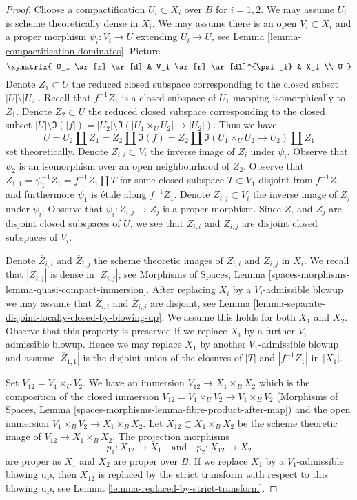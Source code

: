\begin{proof}
Choose a compactification $U_i \subset X_i$ over $B$ for $i = 1, 2$. We may
assume $U_i$ is scheme theoretically dense in $X_i$. We may assume there
is an open $V_i \subset X_i$ and a proper morphism
$\psi_i : V_i \to U$ extending $U_i \to U$, see
Lemma \ref{lemma-compactification-dominates}. Picture
$$
\xymatrix{
U_i \ar[r] \ar[d] & V_i \ar[r] \ar[dl]^{\psi_i} & X_i \\
U
}
$$
Denote $Z_1 \subset U$ the reduced closed subspace corresponding
to the closed subset $|U| \setminus |U_2|$. Recall that $f^{-1}Z_1$
is a closed subspace of $U_1$ mapping isomorphically to $Z_1$.
Denote $Z_2 \subset U$ the reduced closed subspace corresponding
to the closed subset $|U| \setminus \Im(|f|) =
|U_2| \setminus \Im(|U_1 \times_U U_2| \to |U_2|)$.
Thus we have
$$
U = U_2 \amalg Z_1 = Z_2 \amalg \Im(f) =
Z_2 \amalg \Im(U_1 \times_U U_2 \to U_2) \amalg Z_1
$$
set theoretically. Denote $Z_{i, i} \subset V_i$ the inverse image of $Z_i$
under $\psi_i$. Observe that $\psi_2$ is an isomorphism over an open
neighbourhood of $Z_2$. Observe that
$Z_{1, 1} = \psi_1^{-1}Z_1 = f^{-1}Z_1 \amalg T$ for some
closed subspace $T \subset V_1$ disjoint from $f^{-1}Z_1$ and furthermore
$\psi_1$ is \'etale along $f^{-1}Z_1$.
Denote $Z_{i, j} \subset V_i$ the inverse image of $Z_j$ under $\psi_i$.
Observe that $\psi_i : Z_{i, j} \to Z_j$ is a proper morphism.
Since $Z_i$ and $Z_j$ are disjoint closed subspaces of $U$, we see that
$Z_{i, i}$ and $Z_{i, j}$ are disjoint closed subspaces of $V_i$.

\medskip\noindent
Denote $\overline{Z}_{i, i}$ and $\overline{Z}_{i, j}$ the
scheme theoretic images of $Z_{i, i}$ and $Z_{i, j}$ in $X_i$.
We recall that $|Z_{i, j}|$ is dense in $|\overline{Z}_{i, j}|$, see
Morphisms of Spaces, Lemma
\ref{spaces-morphisms-lemma-quasi-compact-immersion}.
After replacing $X_i$ by a $V_i$-admissible blowup we may assume that
$\overline{Z}_{i, i}$ and $\overline{Z}_{i, j}$ are disjoint, see
Lemma \ref{lemma-separate-disjoint-locally-closed-by-blowing-up}.
We assume this holds for both $X_1$ and $X_2$.
Observe that this property is preserved if we replace $X_i$
by a further $V_i$-admissible blowup. Hence we may replace $X_1$ by another
$V_1$-admissible blowup and assume $|\overline{Z}_{1, 1}|$
is the disjoint union of the closures of $|T|$ and $|f^{-1}Z_1|$ in $|X_1|$.

\medskip\noindent
Set $V_{12} = V_1 \times_U V_2$. We have an immersion
$V_{12} \to X_1 \times_B X_2$ which is the composition of the closed
immersion $V_{12} = V_1 \times_U V_2 \to V_1 \times_B V_2$
(Morphisms of Spaces, Lemma
\ref{spaces-morphisms-lemma-fibre-product-after-map})
and the open immersion $V_1 \times_B V_2 \to X_1 \times_B X_2$.
Let $X_{12} \subset X_1 \times_B X_2$ be the scheme theoretic image of
$V_{12} \to X_1 \times_B X_2$. The projection morphisms
$$
p_1 : X_{12} \to X_1
\quad\text{and}\quad
p_2 : X_{12} \to X_2
$$
are proper as $X_1$ and $X_2$ are proper over $B$. If we replace $X_1$ by a
$V_1$-admissible blowing up, then $X_{12}$ is replaced by
the strict transform with respect to this blowing up, see
Lemma \ref{lemma-replaced-by-strict-transform}.


\end{proof}
